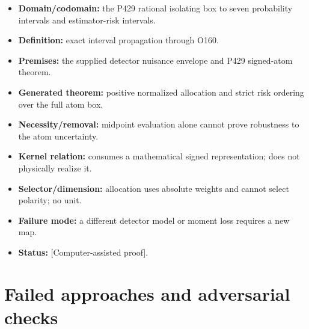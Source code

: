 \documentclass[11pt,a4paper,openany]{report}
\begin{document}
\begin{itemize}
\item 
\textbf{Domain/\allowbreak{}codomain:} the P429 rational isolating box to seven probability intervals and estimator-risk intervals.

\item 
\textbf{Definition:} exact interval propagation through O160.

\item 
\textbf{Premises:} the supplied detector nuisance envelope and P429 signed-atom theorem.

\item 
\textbf{Generated theorem:} positive normalized allocation and strict risk ordering over the full atom box.

\item 
\textbf{Necessity/\allowbreak{}removal:} midpoint evaluation alone cannot prove robustness to the atom uncertainty.

\item 
\textbf{Kernel relation:} consumes a mathematical signed representation; does not physically realize it.

\item 
\textbf{Selector/\allowbreak{}dimension:} allocation uses absolute weights and cannot select polarity; no unit.

\item 
\textbf{Failure mode:} a different detector model or moment loss requires a new map.

\item 
\textbf{Status:} \textcolor{fingreen}{[Computer-assisted proof]}.

\end{itemize}

\chapter{Failed approaches and adversarial checks}
\end{document}
